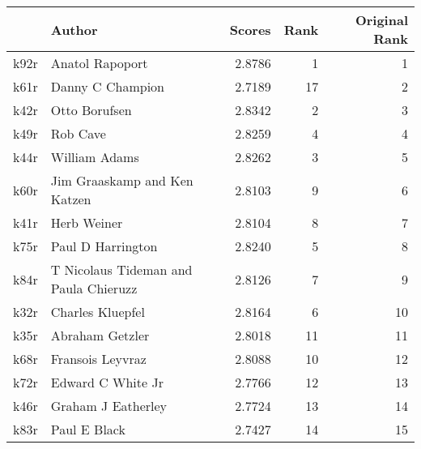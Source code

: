 \begin{tabular}{llrrr}
\toprule
{} &                                 Author &  Scores &  Rank &  Original Rank \\
\midrule
k92r &                        Anatol Rapoport &  2.8786 &     1 &              1 \\
k61r &                       Danny C Champion &  2.7189 &    17 &              2 \\
k42r &                          Otto Borufsen &  2.8342 &     2 &              3 \\
k49r &                               Rob Cave &  2.8259 &     4 &              4 \\
k44r &                          William Adams &  2.8262 &     3 &              5 \\
k60r &           Jim Graaskamp and Ken Katzen &  2.8103 &     9 &              6 \\
k41r &                            Herb Weiner &  2.8104 &     8 &              7 \\
k75r &                      Paul D Harrington &  2.8240 &     5 &              8 \\
k84r &  T Nicolaus Tideman and Paula Chieruzz &  2.8126 &     7 &              9 \\
k32r &                       Charles Kluepfel &  2.8164 &     6 &             10 \\
k35r &                        Abraham Getzler &  2.8018 &    11 &             11 \\
k68r &                       Fransois Leyvraz &  2.8088 &    10 &             12 \\
k72r &                      Edward C White Jr &  2.7766 &    12 &             13 \\
k46r &                     Graham J Eatherley &  2.7724 &    13 &             14 \\
k83r &                           Paul E Black &  2.7427 &    14 &             15 \\
\bottomrule
\end{tabular}
